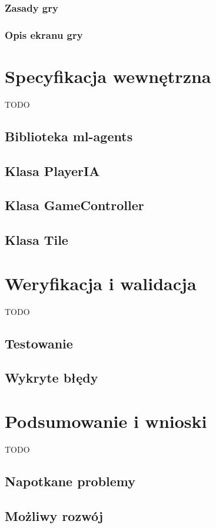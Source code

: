 \documentclass[a4paper,twoside,12pt]{book}
\begin{document}
\subsection{Zasady gry}
\subsection{Opis ekranu gry}

\chapter{Specyfikacja wewnętrzna}%
\label{ch:05}
TODO
\section{Biblioteka ml-agents}
\section{Klasa PlayerIA}
\section{Klasa GameController}
\section{Klasa Tile}

\chapter{Weryfikacja i walidacja}%
\label{ch:06}
TODO
\section{Testowanie}
\section{Wykryte błędy}



\chapter{Podsumowanie i wnioski}%
TODO
\section{Napotkane problemy}%
\section{Możliwy rozwój}%
\end{document}
